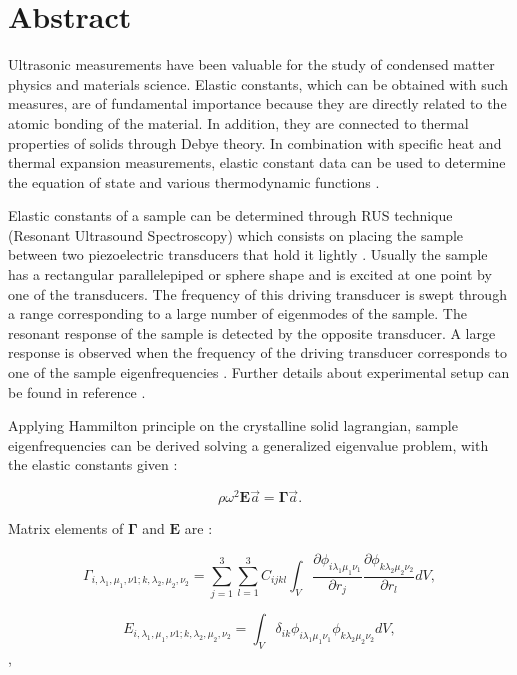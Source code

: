 \documentclass[12pt]{article}
\begin{document}
\section{Abstract}
Ultrasonic measurements have been valuable for the study of condensed matter physics and materials science. Elastic constants, which can be obtained with such measures, are of fundamental importance because they are directly related to the atomic bonding of the material. In addition, they are connected to thermal properties of solids through Debye theory. In combination with specific heat and thermal expansion measurements, elastic constant data can be used to determine the equation of state and various thermodynamic functions \cite{Leisure_1997}.

Elastic constants of a sample can be determined through RUS technique (Resonant Ultrasound Spectroscopy) which consists on placing the sample between two piezoelectric transducers that hold it lightly \cite{MIGLIORI19931}. Usually the sample has a rectangular parallelepiped or sphere shape and is excited at one point by one of the transducers. The frequency of this driving transducer is swept through a range corresponding to a large number of eigenmodes of the sample. The resonant response of the sample is detected by the opposite transducer. A large response is observed when the frequency of the driving transducer corresponds to one of the sample eigenfrequencies \cite{Leisure_1997}. Further details about experimental setup can be found in reference \cite{MIGLIORI19931}.

Applying Hammilton principle on the crystalline solid lagrangian, sample eigenfrequencies can be derived solving a generalized eigenvalue problem, with the elastic constants given \cite{Leisure_1997}:

\begin{equation}
    \rho \omega^2 \bm{E} \vec{a} = \bm{\Gamma} \vec{a}. 
\end{equation}

Matrix elements of $\bm{\Gamma}$ and $\bm{E}$ are \cite{Ohno}: 
 

\begin{equation}
    \Gamma_{i, \lambda_1, \mu_1,  \nu1; k, \lambda_2, \mu_2, \nu_2} = \sum_{j=1}^{3} \sum_{l=1}^{3} {C_{ijkl} \int_{V}{\frac{\partial \phi_{i \lambda_{1} \mu_1 \nu_1}}{\partial r_j} \frac{\partial \phi_{k \lambda_2 \mu_2 \nu_2}}{\partial r_l} dV}},
\end{equation}

\begin{equation}
    E_{i, \lambda_1, \mu_1,  \nu1; k, \lambda_2, \mu_2, \nu_2} = \int_{V}{\delta_{ik} \phi_{i \lambda_1 \mu_1 \nu_1}  \phi_{k \lambda_2 \mu_2 \nu_2} dV},
\end{equation},
\end{document}
